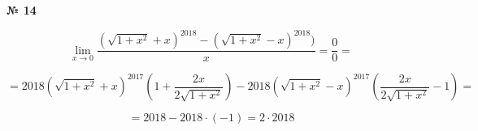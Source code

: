 \documentclass{article}
\begin{document}
\textbf{№ 14} 

$$ \lim\limits_{x \to 0} \frac{\left( \sqrt{1 + x^2} + x \right)^{2018} - \left( \sqrt{1 + x^2} - x \right)^{2018})}{x} 
= \frac{0}{0}
=  $$

$$ = 2018\left( \sqrt{1 + x^2} + x \right)^{2017}\left( 1 + \frac{2x}{2\sqrt{1+x^2}} \right) - 2018\left( \sqrt{1 + x^2} - x \right)^{2017}\left( \frac{2x}{2\sqrt{1+x^2}} - 1 \right)
= $$

$$ = 2018 - 2018 \cdot (-1) 
= 2 \cdot 2018 $$
\end{document}
